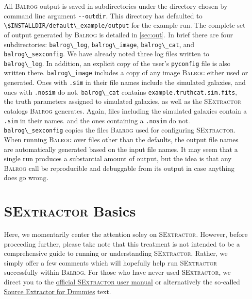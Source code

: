 \documentclass[12pt]{book}
\newcommand{\codett}[1]{\lstinline{#1}}
\newcommand{\pyconfig}{\codett{pyconfig}}
\newcommand{\balrog}{\textsc{Balrog}}
\newcommand{\sex}{\textsc{SExtractor}}
\newcommand{\opt}[1]{\codett{--#1}}
\begin{document}
All \balrog{} output is saved in subdirectories under the directory chosen by command line argument \opt{outdir}.
This directory has defaulted to \codett{\$INSTALLDIR/default\_example/output} for the example run.
The complete set of output generated by \balrog{} is detailed in \autoref{sec:out}.
In brief there are four subdirectories:
\codett{balrog\_log}, \codett{balrog\_image}, \codett{balrog\_cat}, and \codett{balrog\_sexconfig}.
We have already noted three log files written to \codett{balrog\_log}. In addition, an explicit copy of 
the user's \pyconfig{} file is also written there.
\codett{balrog\_image} includes a copy of any image \balrog{} either used or generated.
Ones with \codett{.sim} in their file names include the simulated galaxies, and ones with \codett{.nosim} do not.
\codett{balrog\_cat} contains \codett{example.truthcat.sim.fits}, the truth parameters assigned to simulated galaxies,
as well as the \sex{} catalogs \balrog{} generates.
Again, files including the simulated galaxies contain a \codett{.sim} in their names.
and the ones containing a \codett{.nosim} do not.
\codett{balrog\_sexconfig} copies the files \balrog{} used for configuring \sex{}.
When running \balrog{} over files other than the defaults, 
the output file names are automatically generated based on the input file names.
It may seem that a single run produces a substantial amount of output, but the idea
is that any \balrog{} call be reproducible and debuggable from its output in case anything does go wrong.

\section{\sex{} Basics}
\label{sec:quicksex}

Here, we momentarily center the attention soley on \sex{}.
However, before proceeding further, 
please take note that this treatment is not intended to be a comprehensive guide 
to running or understanding \sex{}.
Rather, we simply offer a few comments which will hopefully help run \sex{} successfully within \balrog{}.
For those who have never used \sex{}, we direct you to the
\href{https://www.astromatic.net/pubsvn/software/sextractor/trunk/doc/sextractor.pdf}{official \sex{} user manual} 
or alternatively the so-called
\href{http://astroa.physics.metu.edu.tr/MANUALS/sextractor/Guide2source\_extractor.pdf}{Source Extractor for Dummies} text.
\end{document}
